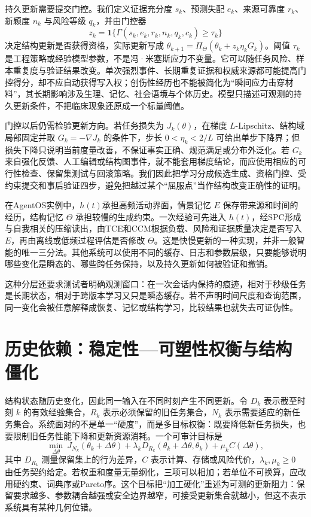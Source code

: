 持久更新需要提交门控。我们定义证据充分度 $s_k$、预测失配 $e_k$、来源可靠度 $r_k$、新颖度 $n_k$ 与风险等级 $q_k$，并由门控器
\[
z_k=\mathbf 1\{\Gamma(s_k,e_k,r_k,n_k,q_k,c_k)\ge \tau_k\}
\]
决定结构更新是否获得资格，实际更新写成 $\theta_{k+1}=\Pi_\Theta(\theta_k+z_k\eta_kG_k)$。阈值 $\tau_k$ 是工程策略或经验模型参数，不是冯·米塞斯应力不变量。它可以随任务风险、样本重复度与验证结果改变。单次强烈事件、长期重复证据和权威来源都可能提高门控得分，却不应自动获得写入权；创伤性经历也不能被简化为“瞬间应力击穿材料”，其长期影响涉及生理、记忆、社会语境与个体历史。模型只描述可观测的持久更新条件，不把临床现象还原成一个标量阈值。

门控以后仍需检验更新方向。若任务损失为 $J_k(\theta)$，在梯度 $L$-Lipschitz、结构域局部固定并取 $G_k=-\nabla J_k$ 的条件下，步长 $0<\eta_k<2/L$ 可给出单步下降界；但损失下降只说明当前度量改善，不保证事实正确、规范满足或分布外泛化。若 $G_k$ 来自强化反馈、人工编辑或结构图事件，就不能套用梯度结论，而应使用相应的可行性检查、保留集测试与回滚策略。我们因此把学习分成候选生成、资格门控、受约束提交和事后验证四步，避免把越过某个“屈服点”当作结构改变正确性的证明。

在AgentOS实例中，$h(t)$承担高频活动界面，情景记忆 $E$ 保存带来源和时间的经历，结构记忆 $\Theta$ 承担较慢的生成约束。一次经验可先进入 $h(t)$，经SPC形成与自我相关的压缩读出，由TCE和CCM根据负载、风险和证据质量决定是否写入 $E$，再由离线或低频过程评估是否修改 $\Theta$。这是快慢更新的一种实现，并非一般智能的唯一三分法。其他系统可以使用不同的缓存、日志和参数层级，只要能够说明哪些变化是瞬态的、哪些跨任务保持，以及持久更新如何被验证和撤销。

这种分层还要求测试者明确观测窗口：在一次会话内保持的痕迹，相对于秒级任务是长期状态，相对于跨版本学习又只是瞬态缓存。若不声明时间尺度和查询范围，同一变化会被任意解释成恢复、记忆或结构学习，比较结果也就失去可证伪性。

\section{历史依赖：稳定性—可塑性权衡与结构僵化}
\label{sec:material_hardening}

结构状态随历史变化，因此同一输入在不同时刻产生不同更新。令 $D_k$ 表示截至时刻 $k$ 的有效经验集合，$R_k$ 表示必须保留的旧任务集合，$N_k$ 表示需要适应的新任务集合。系统面对的不是单一“硬度”，而是多目标权衡：既要降低新任务损失，也要限制旧任务性能下降和更新资源消耗。一个可审计目标是
\[
\min_{\Delta\theta}\ J_{N_k}(\theta_k+\Delta\theta)
+\lambda_k D_{R_k}(\theta_k+\Delta\theta,\theta_k)
+\mu_k C(\Delta\theta),
\]
其中 $D_{R_k}$ 测量保留集上的行为差异，$C$ 表示计算、存储或风险代价，$\lambda_k,\mu_k\ge0$ 由任务契约给定。若权重和度量无量纲化，三项可以相加；若单位不可换算，应改用硬约束、词典序或Pareto序。这个目标把“加工硬化”重述为可测的更新阻力：保留要求越多、参数耦合越强或安全边界越窄，可接受更新集合就越小，但这不表示系统具有某种几何位错。


